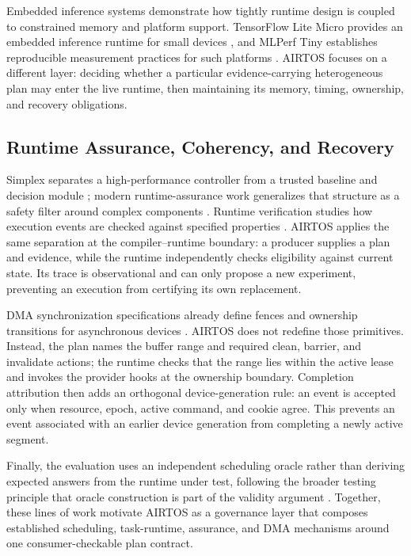 \documentclass[lettersize,journal]{IEEEtran}
\begin{document}
Embedded inference systems demonstrate how tightly runtime design is coupled
to constrained memory and platform support. TensorFlow Lite Micro provides an
embedded inference runtime for small devices \cite{david2021tensorflow}, and
MLPerf Tiny establishes reproducible measurement practices for such platforms
\cite{banbury2021mlperf}. AIRTOS focuses on a different layer: deciding whether
a particular evidence-carrying heterogeneous plan may enter the live runtime,
then maintaining its memory, timing, ownership, and recovery obligations.

\subsection{Runtime Assurance, Coherency, and Recovery}
Simplex separates a high-performance controller from a trusted baseline and
decision module \cite{seto1998simplex}; modern runtime-assurance work generalizes
that structure as a safety filter around complex components
\cite{hobbs2023runtime}. Runtime verification studies how execution events are
checked against specified properties \cite{leucker2009brief}. AIRTOS applies
the same separation at the compiler--runtime boundary: a producer supplies a
plan and evidence, while the runtime independently checks eligibility against
current state. Its trace is observational and can only propose a new
experiment, preventing an execution from certifying its own replacement.

DMA synchronization specifications already define fences and ownership
transitions for asynchronous devices \cite{documentation2026buffer,
documentation2026dma}. AIRTOS does not redefine those primitives. Instead, the
plan names the buffer range and required clean, barrier, and invalidate actions;
the runtime checks that the range lies within the active lease and invokes the
provider hooks at the ownership boundary. Completion attribution then adds an
orthogonal device-generation rule: an event is accepted only when resource,
epoch, active command, and cookie agree. This prevents an event associated with
an earlier device generation from completing a newly active segment.

Finally, the evaluation uses an independent scheduling oracle rather than
deriving expected answers from the runtime under test, following the broader
testing principle that oracle construction is part of the validity argument
\cite{barr2015oracle}. Together, these lines of work motivate AIRTOS as a
governance layer that composes established scheduling, task-runtime,
assurance, and DMA mechanisms around one consumer-checkable plan contract.
\end{document}
